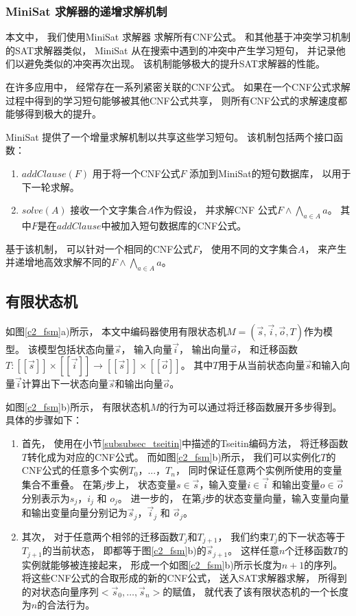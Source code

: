 \subsubsection{MiniSat 求解器的递增求解机制}\label{subsec_incsat}

本文中，
我们使用MiniSat 求解器 求解所有CNF公式。
和其他基于冲突学习机制的SAT求解器类似，
MiniSat 从在搜索中遇到的冲突中产生学习短句，
并记录他们以避免类似的冲突再次出现。
该机制能够极大的提升SAT求解器的性能。

在许多应用中，
经常存在一系列紧密关联的CNF公式。
如果在一个CNF公式求解过程中得到的学习短句能够被其他CNF公式共享，
则所有CNF公式的求解速度都能够得到极大的提升。

MiniSat 提供了一个增量求解机制以共享这些学习短句。
该机制包括两个接口函数：
\begin{enumerate}
\item
$addClause(F)$ 用于将一个CNF公式$F$ 添加到MiniSat的短句数据库，
以用于下一轮求解。
\item
$solve(A)$ 接收一个文字集合$A$作为假设，
并求解CNF 公式$F\wedge \bigwedge_{a\in A} a$。
其中$F$是在$addClause$中被加入短句数据库的CNF公式。
\end{enumerate}

基于该机制，
可以针对一个相同的CNF公式$F$，
使用不同的文字集合$A$，
来产生并递增地高效求解不同的$F\wedge \bigwedge_{a\in A} a$。


\subsection{有限状态机}\label{subsec_fsm}

如图\ref{c2_fsm}a)所示，
本文中编码器使用有限状态机$M=(\vec{s},\vec{i},\vec{o},T)$作为模型。
该模型包括状态向量$\vec{s}$，
输入向量$\vec{i}$，
输出向量$\vec{o}$，
和迁移函数$T: [\![\vec{s}]\!]\times [\![\vec{i}]\!]\to [\![\vec{s}]\!]\times [\![\vec{o}]\!]$。
其中$T$用于从当前状态向量$\vec{s}$和输入向量$\vec{i}$计算出下一状态向量$\vec{s}$和输出向量$\vec{o}$。

如图\ref{c2_fsm}b)所示，
有限状态机$M$的行为可以通过将迁移函数展开多步得到。
具体的步骤如下：
\begin{enumerate}
\item 首先，
使用在小节\ref{subsubsec_tseitin}中描述的Tseitin编码方法，
将迁移函数$T$转化成为对应的CNF公式。
而如图\ref{c2_fsm}b)所示，
我们可以实例化$T$的CNF公式的任意多个实例$T_0$，...，$T_{n}$，
同时保证任意两个实例所使用的变量集合不重叠。
在第$j$步上，
状态变量$s\in\vec{s}$，输入变量$i\in\vec{i}$ 和输出变量$o\in\vec{o}$
分别表示为$s_j$，$i_j$ 和 $o_j$。
进一步的，
在第$j$步的状态变量向量，输入变量向量和输出变量向量分别记为$\vec{s}_j$，$\vec{i}_j$ 和 $\vec{o}_j$。

\item 其次，
对于任意两个相邻的迁移函数$T_j$和$T_{j+1}$，
我们约束$T_j$的下一状态等于$T_{j+1}$的当前状态，
即都等于图\ref{c2_fsm}b)的$\vec{s}_{j+1}$。
这样任意$n$个迁移函数$T$的实例就能够被连接起来，
形成一个如图\ref{c2_fsm}b)所示长度为$n+1$的序列。
将这些CNF公式的合取形成的新的CNF公式，
送入SAT求解器求解，
所得到的对状态向量序列$<\vec{s}_0,\dots,\vec{s}_n>$的赋值，
就代表了该有限状态机的一个长度为$n$的合法行为。
\end{enumerate}


